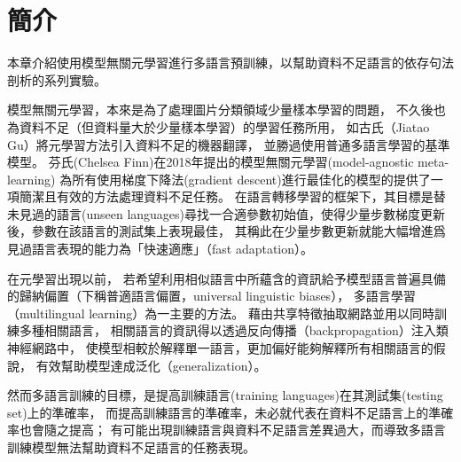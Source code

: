 \section{簡介}

\iffalse
有名的語言學家杭氏（Noam Chomsky）觀察人類習得語言的過程，
他認為嬰孩學習語言時所接收到的語言輸入是不足以讓他們習得該語言的所有特徵的，
許多特性相異的語法都可以產生這些他們所接收到的語料，
但孩童仍然習得了該語言的正確語法，
因此他推斷人類出生時大腦中即具備有某種語言習得裝置（Language acquisition device），
而語言習得裝置的任務便是從所有與語料匹配的語法中挑選正確的語法
\fi
本章介紹使用模型無關元學習進行多語言預訓練，以幫助資料不足語言的依存句法剖析的系列實驗。

模型無關元學習，本來是為了處理圖片分類領域少量樣本學習的問題，
不久後也為資料不足（但資料量大於少量樣本學習）的學習任務所用，
如古氏（Jiatao Gu）將元學習方法引入資料不足的機器翻譯，
並勝過使用普通多語言學習的基準模型\cite{gu-etal-2018-meta}。
芬氏(Chelsea Finn)在2018年提出的模型無關元學習(model-agnostic meta-learning)
\cite{Finn2017ModelAgnosticMF}為所有使用梯度下降法(gradient descent)進行最佳化的模型的提供了一項簡潔且有效的方法處理資料不足任務。
在語言轉移學習的框架下，其目標是替未見過的語言(unseen languages)尋找一合適參數初始值，使得少量步數梯度更新後，參數在該語言的測試集上表現最佳，
其稱此在少量步數更新就能大幅增進爲見過語言表現的能力為「快速適應」（fast adaptation）。

在元學習出現以前，
若希望利用相似語言中所蘊含的資訊給予模型語言普遍具備的歸納偏置（下稱普適語言偏置，universal linguistic biases），
多語言學習（multilingual learning）為一主要的方法\cite{caruana1997multitask}。
藉由共享特徵抽取網路並用以同時訓練多種相關語言，
相關語言的資訊得以透過反向傳播（backpropagation）注入類神經網路中，
使模型相較於解釋單一語言，更加偏好能夠解釋所有相關語言的假說，
有效幫助模型達成泛化（generalization）。

然而多語言訓練的目標，是提高訓練語言(training languages)在其測試集(testing set)上的準確率，
而提高訓練語言的準確率，未必就代表在資料不足語言上的準確率也會隨之提高；
有可能出現訓練語言與資料不足語言差異過大，而導致多語言訓練模型無法幫助資料不足語言的任務表現。

